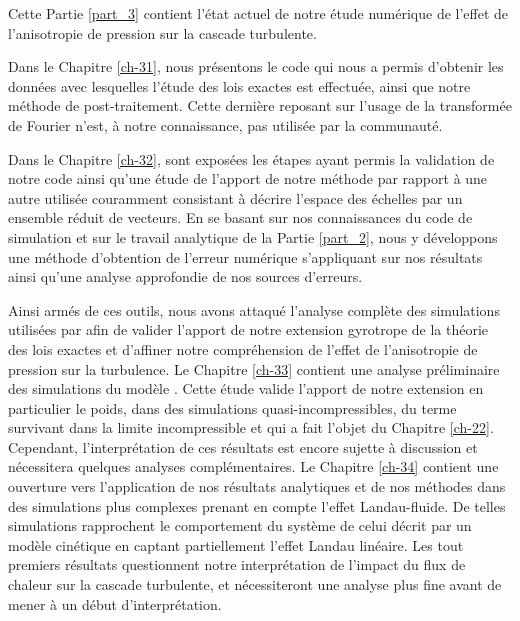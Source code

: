 Cette Partie \ref{part_3} contient l'état actuel de notre étude numérique de l'effet de l'anisotropie de pression sur la cascade turbulente. 

Dans le Chapitre \ref{ch-31}, nous présentons le code qui nous a permis d'obtenir les données avec lesquelles l'étude des lois exactes est effectuée, ainsi que notre méthode de post-traitement. Cette dernière reposant sur l'usage de la transformée de Fourier n'est, à notre connaissance, pas utilisée par la communauté. 

Dans le Chapitre \ref{ch-32}, sont exposées les étapes ayant permis la validation de notre code ainsi qu'une étude de l'apport de notre méthode par rapport à une autre utilisée couramment consistant à décrire l'espace des échelles par un ensemble réduit de vecteurs. En se basant sur nos connaissances du code de simulation et sur le travail analytique de la Partie \ref{part_2}, nous y développons une méthode d'obtention de l'erreur numérique s'appliquant sur nos résultats ainsi qu'une analyse approfondie de nos sources d'erreurs. 

Ainsi armés de ces outils, nous avons attaqué l'analyse complète des simulations utilisées par \cite{ferrand_fluid_2021} afin de valider l'apport de notre extension gyrotrope de la théorie des lois exactes et d'affiner notre compréhension de l'effet de l'anisotropie de pression sur la turbulence. Le Chapitre \ref{ch-33} contient une analyse préliminaire des simulations du modèle . Cette étude valide l'apport de notre extension en particulier le poids, dans des simulations quasi-incompressibles, du terme survivant dans la limite incompressible et qui a fait l'objet du Chapitre \ref{ch-22}. Cependant, l'interprétation de ces résultats est encore sujette à discussion et nécessitera quelques analyses complémentaires. Le Chapitre \ref{ch-34} contient une ouverture vers l'application de nos résultats analytiques et de nos méthodes dans des simulations plus complexes prenant en compte l'effet Landau-fluide. De telles simulations rapprochent le comportement du système de celui décrit par un modèle cinétique en captant partiellement l'effet Landau linéaire. Les tout premiers résultats questionnent notre interprétation de l'impact du flux de chaleur sur la cascade turbulente, et nécessiteront une analyse plus fine avant de mener à un début d'interprétation. 





